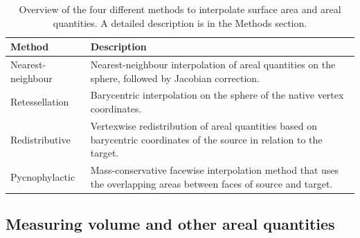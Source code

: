 \begin{table}%
\caption{Overview of the four different methods to interpolate surface area and areal quantities. A detailed description is in the Methods section.}
\begin{center}
\begin{small}
\begin{tabular}{@{}m{28mm}<{\raggedright}m{96mm}<{\raggedright}@{}}
\toprule
\textbf{Method} & \textbf{Description} \\ 
\midrule
Nearest-neighbour & Nearest-neighbour interpolation of areal quantities on the sphere, followed by Jacobian correction.\\
\midrule
Retessellation & Barycentric interpolation on the sphere of the native vertex coordinates.\\
\midrule
Redistributive & Vertexwise redistribution of areal quantities based on bary\-centric coordinates of the source in relation to the target.\\
\midrule
Pycnophylactic & Mass-conservative facewise interpolation method that uses the overlapping areas between faces of source and target.\\
\bottomrule
\end{tabular}
\end{small}
\end{center}
\label{tab:overview}
\end{table}

\subsection{Measuring volume and other areal quantities}

